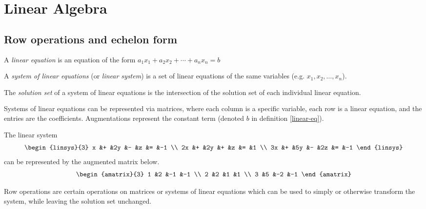 \chapter{Linear Algebra}
\label{ch:linear}

\section{Row operations and echelon form}

\begin{defn}\label{linear-eq}
    A \emph{linear equation} is an equation of the form $a_1x_1 + a_2x_2 + \cdots + a_nx_n = b$
\end{defn}

\begin{defn}\label{linear-sys}
    A \emph{system of linear equations} (or \emph{linear system}) is a set of linear equations of the same variables (e.g. $x_1, x_2, \ldots, x_n$).
\end{defn}

\begin{defn}\label{linear-sys-solutions}
    The \emph{solution set} of a system of linear equations is the intersection of the solution set of each individual linear equation.
\end{defn}

Systems of linear equations can be represented via matrices, where each column is a specific variable, each row is a linear equation, and the entries are the coefficients. Augmentations represent the constant term (denoted $b$ in definition \ref{linear-eq}).

\begin{exmp}
    The linear system \[\begin{linsys}{3}
            x &+ &2y &- &z &= &-1 \\
            2x &+ &2y &+ &z &= &1 \\
            3x &+ &5y &- &2z &= &-1
        \end{linsys}\] can be represented by the augmented matrix below.
    \[\begin{amatrix}{3}
            1 &2 &-1 &-1 \\
            2 &2 &1 &1 \\
            3 &5 &-2 &-1
        \end{amatrix}\]
\end{exmp}

Row operations are certain operations on matrices or systems of linear equations which can be used to simply or otherwise transform the system, while leaving the solution set unchanged.

